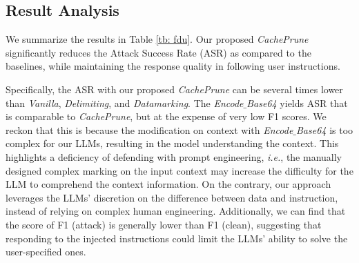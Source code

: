 \subsection{Result Analysis}

We summarize the results in Table \ref{tb: fdu}. 
Our proposed \textit{CachePrune} significantly reduces the Attack Success Rate (ASR) as compared to the baselines, while maintaining the response quality in following user instructions.

Specifically, the ASR with our proposed \textit{CachePrune} can be several times lower than \textit{Vanilla}, \textit{Delimiting}, and \textit{Datamarking}. The \textit{Encode$\_$Base64} yields ASR that is comparable to \textit{CachePrune}, but at the expense of very low F1 scores. 
We reckon that this is because the modification on context with \textit{Encode$\_$Base64} is too complex for our LLMs, resulting in the model understanding the context.
This highlights a deficiency of defending with prompt engineering, \emph{i.e.}, the manually designed complex marking on the input context may increase the difficulty for the LLM to comprehend the context information. 
On the contrary, our approach leverages the LLMs' discretion on the difference between data and instruction, instead of relying on complex human engineering. Additionally, we can find that the score of F1 (attack) is generally lower than F1 (clean), suggesting that responding to the injected instructions could limit the LLMs' ability to solve the user-specified ones.





